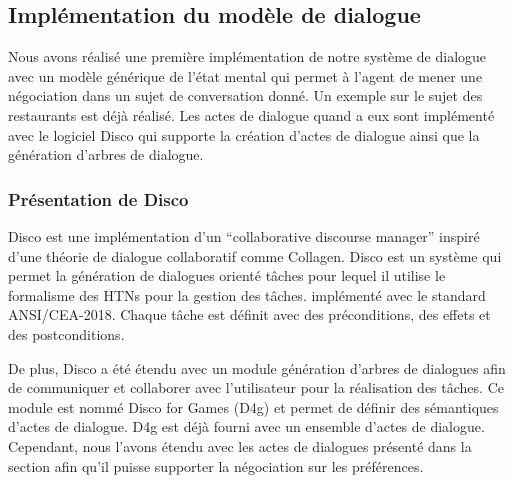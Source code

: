 \documentclass [french]{sig-alternate-05-2015}
\begin{document}
\subsection{Implémentation du modèle de dialogue}

\par Nous avons réalisé une première implémentation de notre système de dialogue avec un modèle générique de l'état mental qui permet à l'agent de mener une négociation dans un sujet de conversation donné. Un exemple sur le sujet des restaurants est déjà réalisé. Les actes de dialogue quand a eux sont implémenté avec le logiciel Disco \cite{rich2009building} qui supporte la création d'actes de dialogue ainsi que la génération d'arbres de dialogue.

\subsubsection{Présentation de Disco}
Disco est une implémentation d'un ``collaborative discourse manager'' inspiré d'une théorie de dialogue collaboratif comme Collagen.  Disco est un système qui permet la génération de dialogues orienté tâches pour lequel il utilise le formalisme des HTNs pour la gestion des tâches. implémenté avec le standard ANSI/CEA-2018.
Chaque tâche est définit avec des préconditions, des effets et des postconditions. 
\par De plus, Disco a été étendu avec un module génération d'arbres de dialogues afin de communiquer et collaborer avec l'utilisateur pour la réalisation des tâches. Ce module est nommé Disco for Games (D4g) et permet de définir des sémantiques d'actes de dialogue. D4g est déjà fourni avec un ensemble d'actes de dialogue. Cependant, nous l'avons étendu avec les actes de dialogues présenté dans la section \label{contribution} afin qu'il puisse supporter la négociation sur les préférences. 
\end{document}
